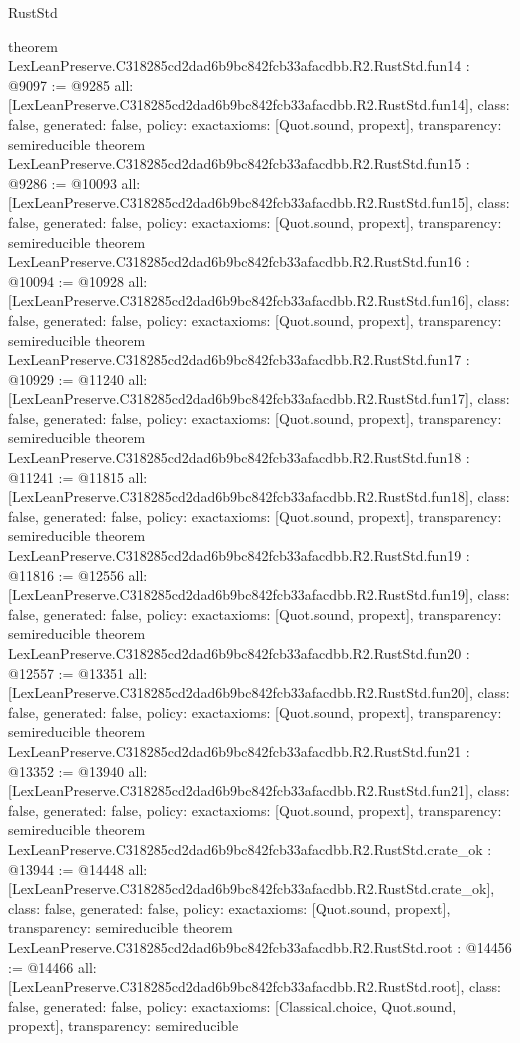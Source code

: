 \begin{lexlean}{RustStd}
\begin{coremodule}
{}
theorem LexLeanPreserve.C318285cd2dad6b9bc842fcb33afacdbb.R2.RustStd.fun14 : @9097 := @9285 {
  all: [LexLeanPreserve.C318285cd2dad6b9bc842fcb33afacdbb.R2.RustStd.fun14],
  class: false,
  generated: false,
  policy: exact{axioms: [Quot.sound, propext]},
  transparency: semireducible
}
theorem LexLeanPreserve.C318285cd2dad6b9bc842fcb33afacdbb.R2.RustStd.fun15 : @9286 := @10093 {
  all: [LexLeanPreserve.C318285cd2dad6b9bc842fcb33afacdbb.R2.RustStd.fun15],
  class: false,
  generated: false,
  policy: exact{axioms: [Quot.sound, propext]},
  transparency: semireducible
}
theorem LexLeanPreserve.C318285cd2dad6b9bc842fcb33afacdbb.R2.RustStd.fun16 : @10094 := @10928 {
  all: [LexLeanPreserve.C318285cd2dad6b9bc842fcb33afacdbb.R2.RustStd.fun16],
  class: false,
  generated: false,
  policy: exact{axioms: [Quot.sound, propext]},
  transparency: semireducible
}
theorem LexLeanPreserve.C318285cd2dad6b9bc842fcb33afacdbb.R2.RustStd.fun17 : @10929 := @11240 {
  all: [LexLeanPreserve.C318285cd2dad6b9bc842fcb33afacdbb.R2.RustStd.fun17],
  class: false,
  generated: false,
  policy: exact{axioms: [Quot.sound, propext]},
  transparency: semireducible
}
theorem LexLeanPreserve.C318285cd2dad6b9bc842fcb33afacdbb.R2.RustStd.fun18 : @11241 := @11815 {
  all: [LexLeanPreserve.C318285cd2dad6b9bc842fcb33afacdbb.R2.RustStd.fun18],
  class: false,
  generated: false,
  policy: exact{axioms: [Quot.sound, propext]},
  transparency: semireducible
}
theorem LexLeanPreserve.C318285cd2dad6b9bc842fcb33afacdbb.R2.RustStd.fun19 : @11816 := @12556 {
  all: [LexLeanPreserve.C318285cd2dad6b9bc842fcb33afacdbb.R2.RustStd.fun19],
  class: false,
  generated: false,
  policy: exact{axioms: [Quot.sound, propext]},
  transparency: semireducible
}
theorem LexLeanPreserve.C318285cd2dad6b9bc842fcb33afacdbb.R2.RustStd.fun20 : @12557 := @13351 {
  all: [LexLeanPreserve.C318285cd2dad6b9bc842fcb33afacdbb.R2.RustStd.fun20],
  class: false,
  generated: false,
  policy: exact{axioms: [Quot.sound, propext]},
  transparency: semireducible
}
theorem LexLeanPreserve.C318285cd2dad6b9bc842fcb33afacdbb.R2.RustStd.fun21 : @13352 := @13940 {
  all: [LexLeanPreserve.C318285cd2dad6b9bc842fcb33afacdbb.R2.RustStd.fun21],
  class: false,
  generated: false,
  policy: exact{axioms: [Quot.sound, propext]},
  transparency: semireducible
}
theorem LexLeanPreserve.C318285cd2dad6b9bc842fcb33afacdbb.R2.RustStd.crate_ok : @13944 := @14448 {
  all: [LexLeanPreserve.C318285cd2dad6b9bc842fcb33afacdbb.R2.RustStd.crate_ok],
  class: false,
  generated: false,
  policy: exact{axioms: [Quot.sound, propext]},
  transparency: semireducible
}
theorem LexLeanPreserve.C318285cd2dad6b9bc842fcb33afacdbb.R2.RustStd.root : @14456 := @14466 {
  all: [LexLeanPreserve.C318285cd2dad6b9bc842fcb33afacdbb.R2.RustStd.root],
  class: false,
  generated: false,
  policy: exact{axioms: [Classical.choice, Quot.sound, propext]},
  transparency: semireducible
}


\end{coremodule}
\end{lexlean}
